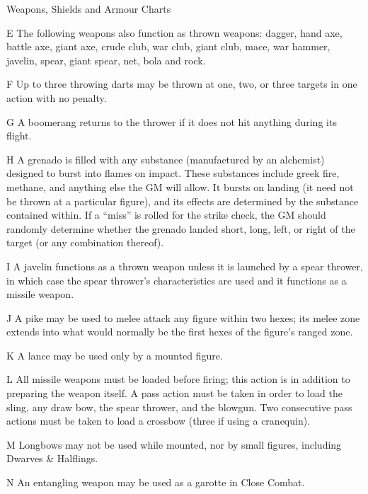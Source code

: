 \begin{Tables}{Weapons, Shields and Armour Charts}
\begin{multicols}{2}
\begin{Description}
\item[E] The following weapons also function as thrown weapons:
  dagger, hand axe, battle axe, giant axe, crude club, war club, giant
  club, mace, war hammer, javelin, spear, giant spear, net, bola and
  rock.

\item[F] Up to three throwing darts may be thrown at one, two, or
  three targets in one action with no penalty.

\item[G] A boomerang returns to the thrower if it does not hit
  anything during its flight.

\item[H] A grenado is filled with any substance (manufactured by an
  alchemist) designed to burst into flames on impact.  These
  substances include greek fire, methane, and anything else the GM
  will allow.  It bursts on landing (it need not be thrown at a
  particular figure), and its effects are determined by the substance
  contained within. If a “miss” is rolled for the strike check, the GM
  should randomly determine whether the grenado landed short, long,
  left, or right of the target (or any combination thereof).

\item[I] A javelin functions as a thrown weapon unless it is launched
  by a spear thrower, in which case the spear thrower’s
  characteristics are used and it functions as a missile weapon.

\item[J] A pike may be used to melee attack any figure within two
  hexes; its melee zone extends into what would normally be the first
  hexes of the figure’s ranged zone.

\item[K] A lance may be used only by a mounted figure.

\item[L] All missile weapons must be loaded before firing; this action
  is in addition to preparing the weapon itself. A pass action must be
  taken in order to load the sling, any draw bow, the spear thrower,
  and the blowgun.  Two consecutive pass actions must be taken to load
  a crossbow (three if using a cranequin).

\item[M] Longbows may not be used while mounted, nor by small figures,
  including Dwarves \& Halflings.

\item[N] An entangling weapon may be used as a garotte in Close
  Combat.


\end{Description}
\end{multicols}
\end{Tables}
